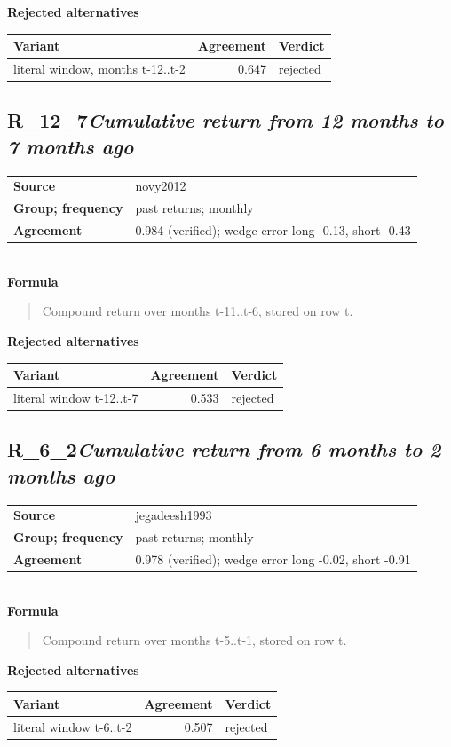 \documentclass[11pt]{article}
\begin{document}
\textbf{Rejected alternatives}\\[2pt]
{\small\begin{longtable}{@{}p{9.6cm}rp{4.3cm}@{}}
\toprule Variant & Agreement & Verdict\\\midrule\endhead
literal window, months t-12..t-2 & 0.647 & rejected\\
\bottomrule\end{longtable}}
\subsection*{R\_12\_7\quad\normalfont\itshape Cumulative return from 12 months to 7 months ago}
\begin{tabular}{@{}p{3.3cm}p{12.3cm}@{}}
\textbf{Source} & novy2012\\
\textbf{Group; frequency} & past returns; monthly\\
\textbf{Agreement} & 0.984 (verified); wedge error long -0.13, short -0.43\\
\end{tabular}\\[4pt]
\textbf{Formula}
\begin{quote}\small
Compound return over months t-11..t-6, stored on row t.\\

\end{quote}
\textbf{Rejected alternatives}\\[2pt]
{\small\begin{longtable}{@{}p{9.6cm}rp{4.3cm}@{}}
\toprule Variant & Agreement & Verdict\\\midrule\endhead
literal window t-12..t-7 & 0.533 & rejected\\
\bottomrule\end{longtable}}
\subsection*{R\_6\_2\quad\normalfont\itshape Cumulative return from 6 months to 2 months ago}
\begin{tabular}{@{}p{3.3cm}p{12.3cm}@{}}
\textbf{Source} & jegadeesh1993\\
\textbf{Group; frequency} & past returns; monthly\\
\textbf{Agreement} & 0.978 (verified); wedge error long -0.02, short -0.91\\
\end{tabular}\\[4pt]
\textbf{Formula}
\begin{quote}\small
Compound return over months t-5..t-1, stored on row t.\\

\end{quote}
\textbf{Rejected alternatives}\\[2pt]
{\small\begin{longtable}{@{}p{9.6cm}rp{4.3cm}@{}}
\toprule Variant & Agreement & Verdict\\\midrule\endhead
literal window t-6..t-2 & 0.507 & rejected\\
\bottomrule\end{longtable}}
\end{document}
